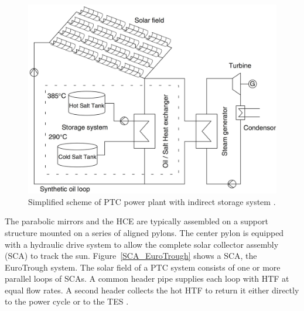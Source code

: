 \begin{figure}[htbp]  
\centering
\includegraphics[width=0.65\linewidth]{FIG/troughtindirecttwotank}
\caption[Simplified scheme of PTC power plant with indirect storage system.]{Simplified scheme of PTC power plant with indirect storage system \cite{Steinmann2012}.}\label{troughtindirecttwotank}
\end{figure}
The parabolic mirrors and the HCE are typically assembled on a support structure mounted on a series of aligned pylons. The center pylon is equipped with a hydraulic drive system to allow the complete solar collector assembly (SCA) to track the sun. Figure~\ref{SCA_EuroTrough} shows a SCA, the EuroTrough system. The solar field of a PTC system consists of one or more parallel loops of SCAs. A common header pipe supplies each loop with HTF at equal flow rates. A second header collects the hot HTF to return it either directly to the power cycle or to the TES \cite{Lupfert2013,Maccari2015}.


